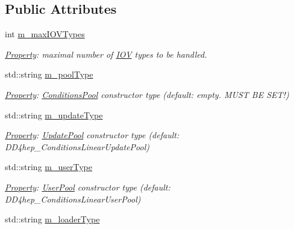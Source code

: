 \subsection*{Public Attributes}
\begin{DoxyCompactItemize}
\item 
int \hyperlink{class_d_d4hep_1_1_conditions_1_1_conditions_manager_object_a8367e7cb7b833dee436e0eacb6c37a87}{m\+\_\+max\+I\+O\+V\+Types}
\begin{DoxyCompactList}\small\item\em \hyperlink{class_d_d4hep_1_1_property}{Property}\+: maximal number of \hyperlink{class_d_d4hep_1_1_i_o_v}{I\+OV} types to be handled. \end{DoxyCompactList}\item 
std\+::string \hyperlink{class_d_d4hep_1_1_conditions_1_1_conditions_manager_object_acbd30bb422ca98796d1eabf4e17706a2}{m\+\_\+pool\+Type}
\begin{DoxyCompactList}\small\item\em \hyperlink{class_d_d4hep_1_1_property}{Property}\+: \hyperlink{class_d_d4hep_1_1_conditions_1_1_conditions_pool}{Conditions\+Pool} constructor type (default\+: empty. M\+U\+ST BE S\+E\+T!) \end{DoxyCompactList}\item 
std\+::string \hyperlink{class_d_d4hep_1_1_conditions_1_1_conditions_manager_object_a015a2e784bea5773c62513f6d24af753}{m\+\_\+update\+Type}
\begin{DoxyCompactList}\small\item\em \hyperlink{class_d_d4hep_1_1_property}{Property}\+: \hyperlink{class_d_d4hep_1_1_conditions_1_1_update_pool}{Update\+Pool} constructor type (default\+: D\+D4hep\+\_\+\+Conditions\+Linear\+Update\+Pool) \end{DoxyCompactList}\item 
std\+::string \hyperlink{class_d_d4hep_1_1_conditions_1_1_conditions_manager_object_abe38ba943a936b6322ec553e53f0c7dd}{m\+\_\+user\+Type}
\begin{DoxyCompactList}\small\item\em \hyperlink{class_d_d4hep_1_1_property}{Property}\+: \hyperlink{class_d_d4hep_1_1_conditions_1_1_user_pool}{User\+Pool} constructor type (default\+: D\+D4hep\+\_\+\+Conditions\+Linear\+User\+Pool) \end{DoxyCompactList}\item 
std\+::string \hyperlink{class_d_d4hep_1_1_conditions_1_1_conditions_manager_object_adc2a8ecbe9ee734901bdf11dc2e3da0e}{m\+\_\+loader\+Type}

\end{DoxyCompactItemize}
